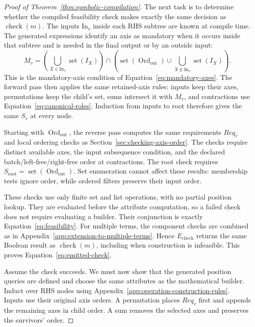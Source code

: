 \begin{proof}[Proof of Theorem~\ref{thm:symbolic-compilation}]
The next task is to determine whether the compiled feasibility check makes exactly
the same decision as $\operatorname{check}(m)$. The inputs $\mathrm{In}_v$ inside each
RHS subtree are known at compile time. The generated expressions identify
an axis as mandatory when it occurs inside that subtree and is needed in the final
output or by an outside input:
\begin{equation}
 M_v=\left(\bigcup_{X\in \mathrm{In}_v}\operatorname{set}(I_X)\right)
 \cap\left(\operatorname{set}(\operatorname{Ord}_{\mathrm{out}})\cup
             \bigcup_{X\notin \mathrm{In}_v}\operatorname{set}(I_X)\right).
 \label{eq:emitted-mandatory}
\end{equation}
This is the mandatory-axis condition of Equation~\eqref{eq:mandatory-axes}.
The forward pass then applies the same retained-axis rules: inputs keep
their axes, permutations keep the child's set, sums intersect it with
$M_v$, and contractions use Equation~\eqref{eq:canonical-roles}. Induction
from inputs to root therefore gives the same $S_v$ at every node.

Starting with $\operatorname{Ord}_{\mathrm{out}}$, the reverse pass computes the same requirements $Req_v$
and local ordering checks as Section~\ref{sec:checking-axis-order}.
The checks require distinct available axes, the input subsequence condition,
and the declared batch/left-free/right-free order at contractions.
The root check requires $S_{\mathrm{root}}=\operatorname{set}(\operatorname{Ord}_{\mathrm{out}})$.
Set enumeration cannot affect these results: membership tests ignore order,
while ordered filters preserve their input order.

These checks use only finite set and list operations, with no partial
position lookup. They are evaluated before the attribute computation, so
a failed check does not require evaluating a builder. Their conjunction
is exactly Equation~\eqref{eq:feasibility}. For multiple terms, the component
checks are combined as in Appendix~\ref{app:extension-to-multiple-terms}. Hence $E_{\mathrm{check}}$
returns the same Boolean result as $\operatorname{check}(m)$, including
when construction is infeasible. This proves Equation~\eqref{eq:emitted-check}.

Assume the check succeeds. We must now show that the generated position
queries are defined and choose the same attributes as the mathematical
builder. Induct over RHS nodes using Appendix~\ref{app:operation-construction-rules}.
Inputs use their original axis orders. A permutation places $Req_v$ first
and appends the remaining axes in child order. A sum removes the selected
axes and preserves the survivors' order.


\end{proof}
